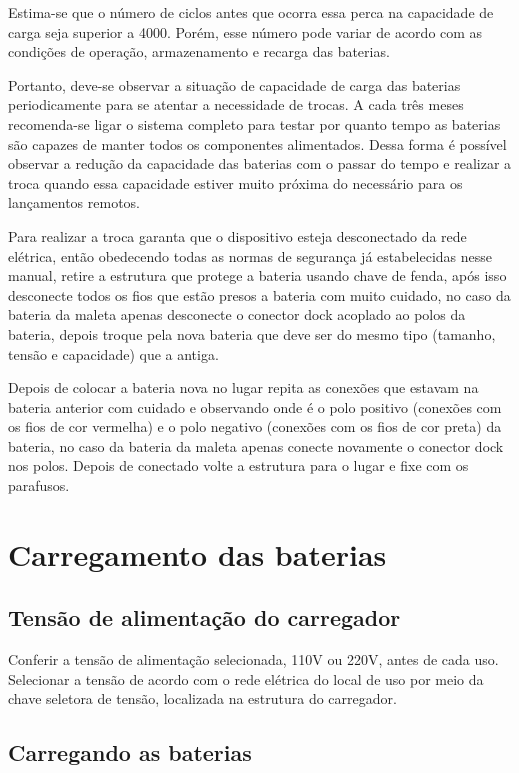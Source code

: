 Estima-se que o número de ciclos antes que ocorra essa perca na capacidade de carga seja superior a 4000. Porém, esse número pode variar de acordo com as condições de operação, armazenamento e recarga das baterias. 

Portanto, deve-se observar a situação de capacidade de carga das baterias periodicamente para se atentar a necessidade de trocas. A cada três meses recomenda-se ligar o sistema completo para testar por quanto tempo as baterias são capazes de manter todos os componentes alimentados. Dessa forma é possível observar a redução da capacidade das baterias com o passar do tempo e realizar a troca quando essa capacidade estiver muito próxima do necessário para os lançamentos remotos.

Para realizar a troca garanta que o dispositivo esteja desconectado da rede elétrica, então obedecendo todas as normas de segurança já estabelecidas nesse manual, retire a estrutura que protege a bateria usando chave de fenda, após isso desconecte todos os fios que estão presos a bateria com muito cuidado, no caso da bateria da maleta apenas desconecte o conector dock acoplado ao polos da bateria, depois troque pela nova bateria que deve ser do mesmo tipo (tamanho, tensão e capacidade) que a antiga. 

Depois de colocar a bateria nova no lugar repita as conexões que estavam na bateria anterior com cuidado e observando onde é o polo positivo (conexões com os fios de cor vermelha) e o polo negativo (conexões com os fios de cor preta) da bateria, no caso da bateria da maleta apenas conecte novamente o conector dock nos polos. Depois de conectado volte a estrutura para o lugar e fixe com os parafusos.

\section*{Carregamento das baterias}

\subsection*{Tensão de alimentação do carregador}
  
Conferir a tensão de alimentação selecionada, 110V ou 220V, antes de cada uso. Selecionar a tensão de acordo com o rede elétrica do local de uso por meio da chave seletora de tensão, localizada na estrutura do carregador.

\subsection*{Carregando as baterias}

